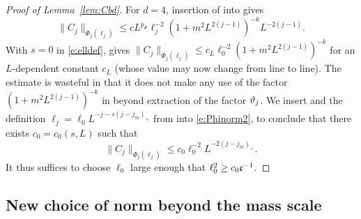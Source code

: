 \begin{proof}[Proof of Lemma~\ref{lem:Cbd}]
For $d=4$, insertion of  into  gives
\begin{equation}
    \label{e:Phinorm2}
    \|C_j\|_{\Phi_{j}(\ell_j)}
    \le
    c
    L^{p_\Phi}
    \ell_j^{-2}(1+m^2L^{2(j-1)})^{-k}
    L^{-2(j-1)}.
\end{equation}
With $s=0$ in \eqref{e:elldef},  gives
$\|C_j\|_{\Phi_{j}(\ell_j)} \le c_L \ell_0^{-2} (1+m^2L^{2(j-1)})^{-k}$
for an $L$-dependent constant $c_L$ (whose value may now change from line to line).
The estimate \cite[\eqref{IE-e:CLbd}]{BS-rg-IE}
is wasteful in that it does not make any use of the factor
$(1+m^2L^{2(j-1)})^{-k}$ in  beyond extraction of the factor $\vartheta_j$.
We insert  and the definition $\ell_j=\ell_0 L^{-j-s(j-j_m)_+}$ from
 into
\eqref{e:Phinorm2}, to conclude that there exists $c_0 = c_0(s, L)$ such that
\begin{equation}
    \|C_j\|_{\Phi_{j}(\ell_j)} \leq c_0 \ell_0^{-2} L^{-2(j - j_m)_+}
    .
\end{equation}
It thus suffices to choose $\ell_0$ large enough that
$\ell_0^2 \ge c_0 \mathfrak{c}^{-1}$.
\end{proof}


\subsection{New choice of norm beyond the mass scale}
\label{sec:newnorm}

